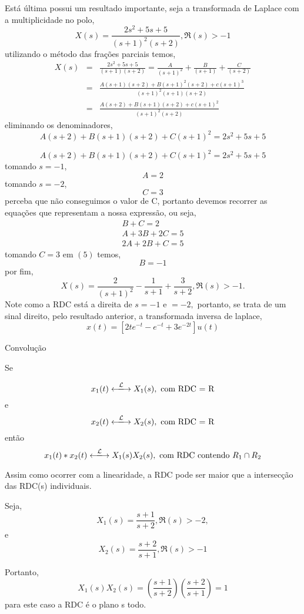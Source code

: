 \documentclass[9pt]{beamer}
\begin{document}
 \begin{frame}
   Est\'{a} \'{u}ltima possui um resultado importante, seja a transformada de Laplace com a multiplicidade no polo,
$$ X(s) \equal \frac {2s^2 + 5s + 5} { (s + 1)^2  (s + 2)}, \Re (s) > -1$$ 
utilizando o m\'{e}todo das fra\c{c}\~{o}es parciais temos,
\begin{eqnarray}
  X(s) & \equal & \frac{2s^2 + 5s + 5} {(s + 1) (s + 2)} \equal \frac{A} {(s + 1)^2} + \frac {B} {(s + 1)} + \frac {C} {(s + 2)} \nonumber \\ 
  & \equal & \frac {A (s + 1) (s +2) + B(s + 1)^2 (s + 2) + c (s + 1)^3} { (s + 1)^2 (s + 1) (s + 2)} \nonumber \\
  & \equal & \frac {A(s + 2) + B (s + 1)(s + 2) + c(s + 1)^2} { (s + 1)^2 (s + 2)} \nonumber 
\end{eqnarray}
\newline
eliminando os denominadores,
$$A(s + 2) + B (s + 1)(s + 2) + C(s + 1)^2 \equal 2s^2 + 5s + 5$$
 \end{frame}
 \begin{frame}
   $$A(s + 2) + B (s + 1)(s + 2) + C(s + 1)^2 \equal 2s^2 + 5s + 5$$
tomando $ s \equal -1$, 
$$ A \equal 2 $$
\newline
tomando $ s \equal -2 $,
$$ C \equal 3 $$
perceba que n\~{a}o conseguimos o valor de C, portanto devemos recorrer as equa\c{c}\~{o}es que representam a nossa express\~{a}o, ou seja,
\begin{eqnarray}
  B + C  \equal 2\\
  A + 3B + 2C \equal 5 \\
  2A + 2B + C \equal 5 
\end{eqnarray}
\newline
tomando $ C \equal 3 $ em  $ (5)$ temos, 
$$ B \equal -1$$
por fim,
$$ X(s) \equal \frac {2} {(s + 1)^2} - \frac {1} {s + 1} + \frac {3} {s + 2}, \Re(s) > -1 .$$ 
Note como a RDC est\'{a} a direita de $s \equal -1 $ e $ \equal -2,$ portanto, se trata de um sinal direito, pelo resultado anterior, a transformada inversa de laplace,
$$ x(t) \equal \left [ 2te^{-t}  - e^{-t} + 3e^{-2t} \right] u(t) $$ 
 \end{frame}
 \begin{frame}{ Convolu\c{c}\~{a}o}
\begin{center}
  Se
  \par
  $$ x_1(t) \xlongleftrightarrow{\mathcal{L}} X_1(s), \textrm{ com RDC = R}$$
  e
  $$ x_2(t) \xlongleftrightarrow{\mathcal{L}} X_2(s), \textrm{ com RDC = R}$$
  ent\~{a}o 
  $$ x_1(t)*x_2(t) \xlongleftrightarrow{\mathcal{L}} X_1(s)X_2(s), \textrm{ com RDC contendo $ R_1 \cap R_2$}$$ 
\end{center}
\par
Assim como ocorrer com a linearidade, a RDC pode ser maior que a intersec\c{c}\~{a}o das RDC(s) individuais.
\par
Seja, 
$$ X_1(s) \equal \frac {s + 1} { s + 2}, \Re(s) > -2, $$
e
$$ X_2(s) \equal \frac {s + 2} { s + 1}, \Re(s) > -1 $$
\par
Portanto,
$$  X_1(s)  X_2(s)  \equal \left (\frac {s + 1} { s + 2} \right)  \left (\frac {s + 2} {s + 1} \right) \equal 1 $$  
para este caso a RDC \'{e} o plano s todo.
 \end{frame}
\end{document}
